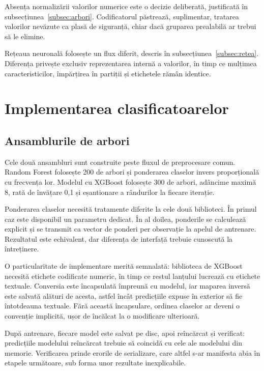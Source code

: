 Absența normalizării valorilor numerice este o decizie deliberată, justificată în subsecțiunea~\ref{subsec:arbori}. Codificatorul păstrează, suplimentar, tratarea valorilor nevăzute ca plasă de siguranță, chiar dacă gruparea prealabilă ar trebui să le elimine.

Rețeaua neuronală folosește un flux diferit, descris în subsecțiunea~\ref{subsec:retea}. Diferența privește exclusiv reprezentarea internă a valorilor, în timp ce mulțimea caracteristicilor, împărțirea în partiții și etichetele rămân identice.

\section{Implementarea clasificatoarelor}\label{sec:clasificatoare}

\subsection{Ansamblurile de arbori}\label{subsec:ansambluri}

Cele două ansambluri sunt construite peste fluxul de preprocesare comun. Random Forest folosește 200 de arbori și ponderarea claselor invers proporțională cu frecvența lor. Modelul cu XGBoost folosește 300 de arbori, adâncime maximă 8, rată de învățare 0{,}1 și eșantionare a rândurilor la fiecare iterație.

Ponderarea claselor necesită tratamente diferite la cele două biblioteci. În primul caz este disponibil un parametru dedicat. În al doilea, ponderile se calculează explicit și se transmit ca vector de ponderi per observație la apelul de antrenare. Rezultatul este echivalent, dar diferența de interfață trebuie cunoscută la întreținere.

O particularitate de implementare merită semnalată: biblioteca de XGBoost necesită etichete codificate numeric, în timp ce restul lanțului lucrează cu etichete textuale. Conversia este încapsulată împreună cu modelul, iar maparea inversă este salvată alături de acesta, astfel încât predicțiile expuse în exterior să fie întotdeauna textuale. Fără această încapsulare, ordinea claselor ar deveni o convenție implicită, ușor de încălcat la o modificare ulterioară.

După antrenare, fiecare model este salvat pe disc, apoi reîncărcat și verificat: predicțiile modelului reîncărcat trebuie să coincidă cu cele ale modelului din memorie. Verificarea prinde erorile de serializare, care altfel s-ar manifesta abia în etapele următoare, sub forma unor rezultate inexplicabile.

